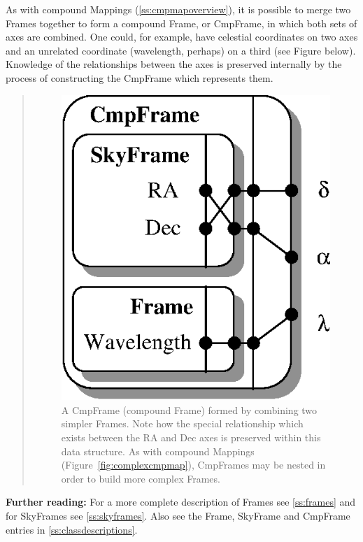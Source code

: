 \documentclass[twoside,11pt]{article}
\newcommand{\appref}[1]{Appendix~\ref{#1}}
\newcommand{\secref}[1]{\S\ref{#1}}
\renewcommand{\appref}[1]{\ref{#1}}
\renewcommand{\secref}[1]{\ref{#1}}
\begin{document}
\begin{htmlonly}
   As with compound Mappings (\secref{ss:cmpmapoverview}), it is possible
   to merge two Frames together to form a compound Frame, or CmpFrame, in
   which both sets of axes are combined.  One could, for example, have
   celestial coordinates on two axes and an unrelated coordinate
   (wavelength, perhaps) on a third (see Figure below).  Knowledge of the
   relationships between the axes is preserved internally by the process
   of constructing the CmpFrame which represents them.
   \begin{quote}
   \begin{figure}
   \label{fig:cmpframe}
   \includegraphics[scale=1.5]{sun211_figures/cmpframe.eps}
   \caption{A CmpFrame (compound Frame) formed by combining two simpler
   Frames. Note how the special relationship which exists between the RA
   and Dec axes is preserved within this data structure. As with compound
   Mappings (Figure~\ref{fig:complexcmpmap}), CmpFrames may be nested in
   order to build more complex Frames.}
   \end{figure}
   \end{quote}
\end{htmlonly}

{\bf{Further reading:}} For a more complete description of Frames see
\secref{ss:frames} and for SkyFrames see \secref{ss:skyframes}.  Also
see the Frame, SkyFrame and CmpFrame entries in
\appref{ss:classdescriptions}.
\end{document}

